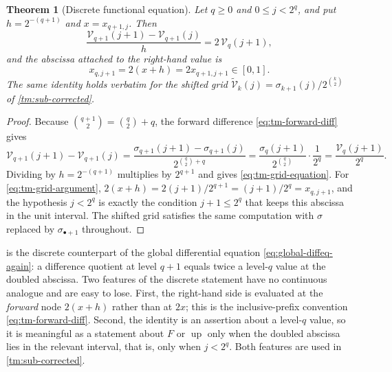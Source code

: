 \documentclass[11pt,oneside]{article}
\newtheorem{theorem}{Theorem}[section]
\theoremstyle{definition}
\theoremstyle{remark}
\newcommand{\Up}{\operatorname{up}}
\begin{document}
\begin{theorem}[Discrete functional equation]
\label{thm:tm-grid-equation}
Let $q\ge0$ and $0\le j<2^q$, and put $h=2^{-(q+1)}$ and $x=x_{q+1,j}$.  Then
\begin{equation}
 \frac{\mathcal V_{q+1}(j+1)-\mathcal V_{q+1}(j)}{h}
 =2\,\mathcal V_q(j+1),                                    \label{eq:tm-grid-equation}
\end{equation}
and the abscissa attached to the right-hand value is
\begin{equation}
 x_{q,j+1}=2(x+h)=2x_{q+1,j+1}\in[0,1].                   \label{eq:tm-grid-argument}
\end{equation}
The same identity holds verbatim for the shifted grid
$\widetilde{\mathcal V}_k(j)=\sigma_{k+1}(j)/2^{\binom k2}$ of
\cref{tm:sub-corrected}.
\end{theorem}

\begin{proof}
Because $\binom{q+1}2=\binom q2+q$, the forward difference \eqref{eq:tm-forward-diff} gives
\begin{equation*}
 \mathcal V_{q+1}(j+1)-\mathcal V_{q+1}(j)
 =\frac{\sigma_{q+1}(j+1)-\sigma_{q+1}(j)}{2^{\binom q2+q}}
 =\frac{\sigma_q(j+1)}{2^{\binom q2}}\cdot\frac1{2^q}
 =\frac{\mathcal V_q(j+1)}{2^q}.
\end{equation*}
Dividing by $h=2^{-(q+1)}$ multiplies by $2^{q+1}$ and gives \eqref{eq:tm-grid-equation}.
For \eqref{eq:tm-grid-argument}, $2(x+h)=2(j+1)/2^{q+1}=(j+1)/2^q=x_{q,j+1}$, and the
hypothesis $j<2^q$ is exactly the condition $j+1\le2^q$ that keeps this abscissa in the unit
interval.  The shifted grid satisfies the same computation with $\sigma$ replaced by
$\sigma_{\bullet+1}$ throughout.
\end{proof}

 is the discrete counterpart of the global differential equation
\eqref{eq:global-diffeq-again}: a difference quotient at level $q+1$ equals twice a
level-$q$ value at the doubled abscissa.  Two features of the discrete statement have no
continuous analogue and are easy to lose.  First, the right-hand side is evaluated at the
\emph{forward} node $2(x+h)$ rather than at $2x$; this is the inclusive-prefix convention
\eqref{eq:tm-forward-diff}.  Second, the identity is an assertion about a level-$q$ value,
so it is meaningful as a statement about $F$ or $\Up$ only when the doubled abscissa lies in
the relevant interval, that is, only when $j<2^q$.  Both features are used in
\cref{tm:sub-corrected}.
\end{document}
